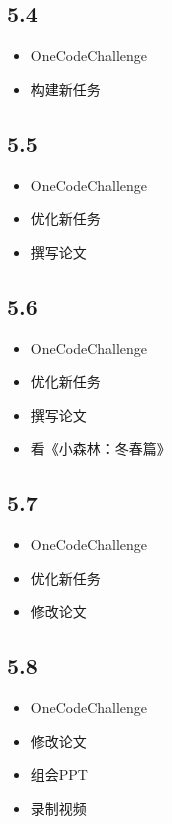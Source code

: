 \documentclass[UTF8]{ctexart}
\begin{document}
\subsection*{5.4}
\begin{itemize}
    \item OneCodeChallenge
    \item 构建新任务
\end{itemize}

\subsection*{5.5}
\begin{itemize}
    \item OneCodeChallenge
    \item 优化新任务
    \item 撰写论文
\end{itemize}

\subsection*{5.6}
\begin{itemize}
    \item OneCodeChallenge
    \item 优化新任务
    \item 撰写论文
    \item 看《小森林：冬春篇》
\end{itemize}

\subsection*{5.7}
\begin{itemize}
    \item OneCodeChallenge
    \item 优化新任务
    \item 修改论文
\end{itemize}

\subsection*{5.8}
\begin{itemize}
    \item OneCodeChallenge
    \item 修改论文
    \item 组会PPT
    \item 录制视频
\end{itemize}
\end{document}
